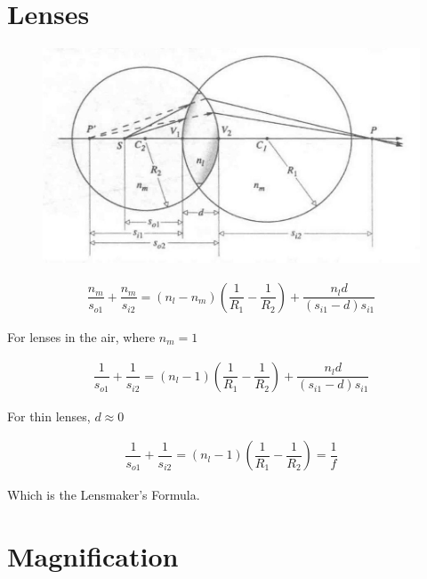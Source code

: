 \section{Lenses}

\begin{figure}[H]
  \centering
  \includegraphics[width=0.5\linewidth]{figures/Thin-Lens.jpg}
\end{figure}

\begin{equation*}
  \begin{aligned}
    \dfrac{n_m}{s_{o1}} + \dfrac{n_m}{s_{i2}} = \left( n_l - n_m \right) \left( \dfrac{1}{R_1} - \dfrac{1}{R_2}   \right) + \dfrac{n_l d}{\left( s_{i1} - d \right) s_{i1}} 
  \end{aligned}
\end{equation*}

For lenses in the air, where $n_m = 1$

\begin{equation*}
  \begin{aligned}
    \dfrac{1}{s_{o1}} + \dfrac{1}{s_{i2}} = \left( n_l - 1 \right) \left( \dfrac{1}{R_1} - \dfrac{1}{R_2}   \right) + \dfrac{n_l d}{\left( s_{i1} - d \right) s_{i1}} 
  \end{aligned}
\end{equation*}

For thin lenses, $d \approx 0$

\begin{equation*}
  \begin{aligned}
    \dfrac{1}{s_{o1}} + \dfrac{1}{s_{i2}} = \left( n_l - 1 \right) \left( \dfrac{1}{R_1} - \dfrac{1}{R_2}   \right) = \dfrac{1}{f} 
  \end{aligned}
\end{equation*}

Which is the Lensmaker's Formula.

\section{Magnification}

